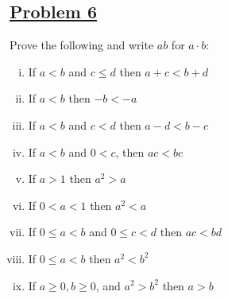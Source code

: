 \documentclass[10pt,letterpaper]{article}
\begin{document}
	\subsection*{{\color{purple}\underline{Problem 6}}}
	Prove the following and write $ab$ for $a \cdot b$:
	\begin{enumerate}[(i)]
		\item If $a < b$ and $c \leq d$ then $a + c < b + d$ 
		\item If $a < b$ then $-b < -a$ 
		\item If $a < b$ and $c < d$ then $a - d < b - c$ 
		\item If $a < b$ and $0 < c$, then $ac < bc$ 
		\item If $a > 1$ then $a^2 > a$
		\item If $0 < a < 1$ then $a^2 < a$
		\item If $0 \leq a < b$ and $0 \leq c < d$ then $ac < bd$
		\item If $0 \leq a < b$ then $a^2 < b^2$ 
		\item If $a \geq 0, b \geq 0$, and $a^2 > b^2$ then $a > b$
	\end{enumerate}
\end{document}
